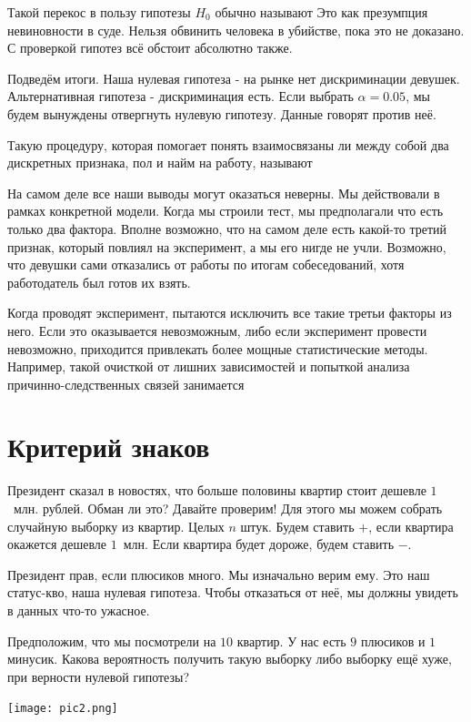 \documentclass[12pt, a4paper, oneside]{article}
\begin{document}
Такой перекос в пользу гипотезы $H_0$ обычно называют  Это как презумпция невиновности в суде. Нельзя обвинить человека в убийстве, пока это не доказано. С проверкой гипотез всё обстоит абсолютно также.  

Подведём итоги. Наша нулевая гипотеза - на рынке нет дискриминации девушек. Альтернативная гипотеза - дискриминация есть. Если выбрать $\alpha = 0.05$, мы будем вынуждены отвергнуть нулевую гипотезу. Данные говорят против неё.  

Такую процедуру, которая помогает понять взаимосвязаны ли между собой два дискретных признака, пол и найм на работу, называют  

На самом деле все наши выводы могут оказаться неверны. Мы действовали в рамках конкретной модели. Когда мы строили тест, мы предполагали что есть только два фактора. Вполне возможно, что на самом деле есть какой-то третий признак, который повлиял на эксперимент, а мы его нигде не учли. Возможно, что девушки сами отказались от работы по итогам собеседований, хотя работодатель был готов их взять. 

Когда проводят эксперимент, пытаются исключить все такие третьи факторы из него. Если это оказывается невозможным, либо если эксперимент провести невозможно, приходится привлекать более мощные статистические методы. Например, такой очисткой от лишних зависимостей и попыткой анализа причинно-следственных связей занимается  

\section{Критерий знаков}

Президент сказал в новостях, что больше половины квартир стоит дешевле $1$~млн. рублей. Обман ли это? Давайте проверим! Для этого мы можем собрать случайную выборку из квартир. Целых $n$ штук. Будем ставить $+$, если квартира окажется дешевле $1$~млн. Если квартира будет дороже, будем ставить $-$. 

Президент прав, если плюсиков много. Мы изначально верим ему. Это наш статус-кво, наша нулевая гипотеза. Чтобы отказаться от неё, мы должны увидеть в данных что-то ужасное. 

Предположим, что мы посмотрели на $10$ квартир. У нас есть $9$ плюсиков и $1$ минусик. Какова вероятность получить такую выборку либо выборку ещё хуже, при верности нулевой гипотезы? 

\begin{center} 
\texttt{[image: pic2.png]}
\end{center} 
\end{document}
